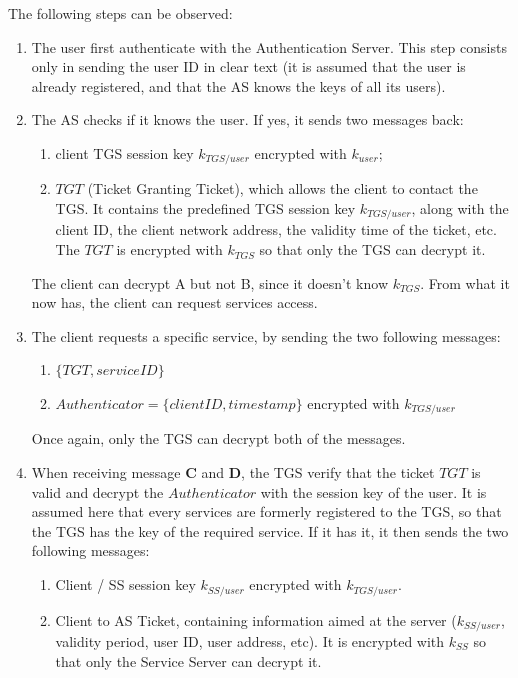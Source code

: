 The following steps can be observed:
\begin{enumerate}
	\item The user first authenticate with the Authentication Server. This step consists only in sending the user ID in clear text (it is assumed that the user is already registered, and that the AS knows the keys of all its users).
	\item The AS checks if it knows the user. If yes, it sends two messages back: 
	\begin{enumerate}[label=\bfseries\Alph*)]
		\item client TGS session key $k_{TGS/user}$ encrypted with $k_{user}$;
		\item $TGT$ (Ticket Granting Ticket), which allows the client to contact the TGS. It contains the predefined TGS session key  $k_{TGS/user}$, along with the client ID, the client network address, the validity time of the ticket, etc. The $TGT$ is encrypted with $k_{TGS}$ so that only the TGS can decrypt it.
	\end{enumerate}
	The client can decrypt A but not B, since it doesn't know $k_{TGS}$. From what it now has, the client can request services access.
	
	\item The client requests a specific service, by sending the two following messages:
	\begin{enumerate}[label=\bfseries\Alph*), resume]
		\item $\lbrace TGT, service ID \rbrace$
		\item $Authenticator=\lbrace client ID, timestamp \rbrace$ encrypted with $k_{TGS/user}$ 
	\end{enumerate}
	Once again, only the TGS can decrypt both of the messages.
	
	\item When receiving message \textbf{C} and \textbf{D}, the TGS verify that the ticket $TGT$ is valid and decrypt the $Authenticator$ with the session key of the user. It is assumed here that every services are formerly registered to the TGS, so that the TGS has the key of the required service. If it has it, it then sends the two following messages:
	\begin{enumerate}[label=\bfseries\Alph*), resume]
		\item Client / SS session key $k_{SS/user}$ encrypted with $k_{TGS/user}$.
			\item Client to AS Ticket, containing information aimed at the server ($k_{SS/user}$, validity period, user ID, user address, etc). It is encrypted with $k_{SS}$ so that only the Service Server can decrypt it.
	\end{enumerate}
	

\end{enumerate}
